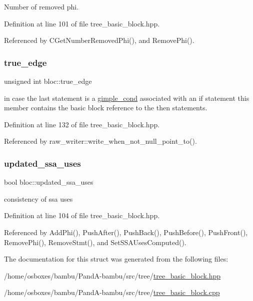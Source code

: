 Number of removed phi. 



Definition at line 101 of file tree\+\_\+basic\+\_\+block.\+hpp.



Referenced by C\+Get\+Number\+Removed\+Phi(), and Remove\+Phi().

\mbox{\label{structbloc_a6ff01e0eb0e2d225be8bec35d051648a}} 
\subsubsection{\texorpdfstring{true\+\_\+edge}{true\_edge}}
{\footnotesize\ttfamily unsigned int bloc\+::true\+\_\+edge}



in case the last statement is a \hyperlink{structgimple__cond}{gimple\+\_\+cond} associated with an if statement this member contains the basic block reference to the then statements. 



Definition at line 132 of file tree\+\_\+basic\+\_\+block.\+hpp.



Referenced by raw\+\_\+writer\+::write\+\_\+when\+\_\+not\+\_\+null\+\_\+point\+\_\+to().

\mbox{\label{structbloc_afe9b207ef643a3c86c2b915614079cd1}} 
\subsubsection{\texorpdfstring{updated\+\_\+ssa\+\_\+uses}{updated\_ssa\_uses}}
{\footnotesize\ttfamily bool bloc\+::updated\+\_\+ssa\+\_\+uses\hspace{0.3cm}{\ttfamily [private]}}



consistency of ssa uses 



Definition at line 104 of file tree\+\_\+basic\+\_\+block.\+hpp.



Referenced by Add\+Phi(), Push\+After(), Push\+Back(), Push\+Before(), Push\+Front(), Remove\+Phi(), Remove\+Stmt(), and Set\+S\+S\+A\+Uses\+Computed().



The documentation for this struct was generated from the following files\+:\begin{DoxyCompactItemize}
\item 
/home/osboxes/bambu/\+Pand\+A-\/bambu/src/tree/\hyperlink{tree__basic__block_8hpp}{tree\+\_\+basic\+\_\+block.\+hpp}\item 
/home/osboxes/bambu/\+Pand\+A-\/bambu/src/tree/\hyperlink{tree__basic__block_8cpp}{tree\+\_\+basic\+\_\+block.\+cpp}\end{DoxyCompactItemize}
